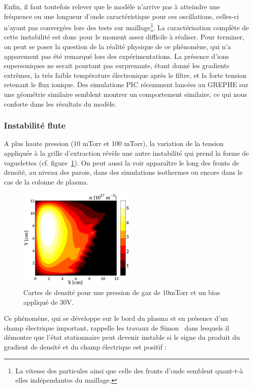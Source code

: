 \begin{refsection}
Enfin, il faut toutefois relever que le modèle n'arrive pas à atteindre 
une fréquence ou une longueur d'onde caractéristique pour ces oscillations,
celles-ci n'ayant pas convergées lors des tests sur maillage\footnote{La
vitesse des particules ainsi que celle des fronts d'onde semblent quant-t-à
elles indépendantes du maillage.}.
La caractérisation complète de cette instabilité est donc pour le moment
assez difficile à réaliser.
Pour terminer, on peut se poser la question de la réalité physique de
ce phénomène, qui n'a apparement pas été remarqué lors des expérimentations. La
présence d'ions supersoniques ne serait pourtant pas surprenante, étant donné
les gradients extrêmes, la très faible température électronique 
après le filtre, et la forte tension retenant le flux ionique.
Des simulations PIC récemment lancées au GREPHE sur une géométrie similaire
semblent montrer un comportement similaire, ce qui nous conforte dans les
résultats du modèle.

	\subsubsection{Instabilité flute}
	A plus haute pression (10 mTorr et 100 mTorr), la variation de la tension
	appliquée à la grille d'extraction révèle une autre instabilité qui prend la
	forme de vaguelettes (cf.
	figure~\ref{4-PegasesCarteDensiteVarBias5}). On peut aussi la voir apparaître
	le long des fronts de densité, au niveau des parois, dans des
	simulations isothermes ou encore dans le cas de la colonne de plasma.
		
\begin{figure}[htbp]
  \centering
    \includegraphics[height=5cm]{figures/4-PegasesCarteDensiteVarBias5.eps}
    \caption{Cartes de densité pour une pression de gaz de 10mTorr et un bias
    appliqué de 30V.\label{4-PegasesCarteDensiteVarBias5}}
\end{figure}
	
	Ce phénomène, qui se développe sur le bord du plasma et
	en présence d'un champ électrique important, rappelle
	les travaux de Simon~\parencite{Simon63} dans lesquels il démontre que l'état
	stationnaire peut devenir instable si le signe du produit du
	gradient de densité et du champ électrique est positif :
	

\end{refsection}
